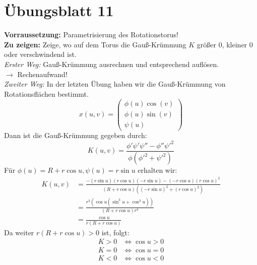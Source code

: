 %
\section{Übungsblatt 11}

\begin{problem}[1]
  \textbf{Vorraussetzung:} Parametrisierung des Rotationstorus! \\
  \textbf{Zu zeigen:} Zeige, wo auf dem Torus die Gauß-Krümmung \( K \) größer 0, kleiner 0 oder verschwindend ist. \\
  \emph{Erster Weg:} Gauß-Krümmung ausrechnen und entsprechend auflösen. \\
  \( \rightarrow \) Rechenaufwand! \\
  \emph{Zweiter Weg:} In der letzten Übung haben wir die Gauß-Krümmung von Rotationsflächen bestimmt.
  \begin{equation*}
    x(u,v) = \begin{pmatrix}
      \phi(u) \cos(v) \\
      \phi(u) \sin(v) \\
      \psi(u)	
    \end{pmatrix}
  \end{equation*}
  Dann ist die Gauß-Krümmung gegeben durch: 
  \begin{equation*}	
    K(u,v) = \frac{\phi' \psi' \psi'' - \phi'' \psi'^2}{\phi(\phi'^2 + \psi'^2)}
  \end{equation*}
  Für \( \phi(u) = R + r \cos u, \psi(u) = r \sin u \) erhalten wir:
  \begin{align*}
    K(u,v) &= \frac{-(r \sin u)(r \cos u)(-r \sin u)-(-r \cos u){(r \cos u)}^2}{(R+r \cos u)({(-r \sin u)}^2 + {(r \cos u)}^2)} \\
    &= \frac{r^3(\cos u(\sin^3u + \cos^3 u))}{ (R + r \cos u) r^4} \\
    &= \frac{\cos u}{r(R+r \cos u)} 
  \end{align*}
  Da weiter \( r(R + r \cos u) > 0 \) ist, folgt: 
  \begin{align*}
    K > 0 &\Leftrightarrow \cos u > 0 \\
    K = 0 &\Leftrightarrow \cos u = 0 \\
    K < 0 &\Leftrightarrow \cos u < 0
  \end{align*}


\end{problem}
